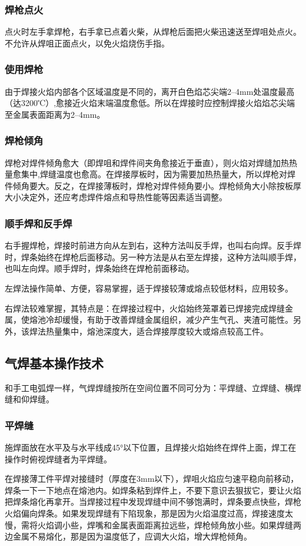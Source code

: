 \documentclass{ctexbook}
\begin{document}
\subsubsection{焊枪点火}
点火时左手拿焊枪，右手拿已点着火柴，从焊枪后面把火柴迅速送至焊咀处点火。不允许从焊咀正面点火，以免火焰烧伤手指。
\subsubsection{使用焊枪}
由于焊接火焰内部各个区域温度是不同的，离开白色焰芯尖端2--4mm处温度最高（达3200℃）,愈接近火焰末端温度愈低。所以在焊接时应控制焊接火焰焰芯尖端至金属表面距离为2--4mm。
\subsubsection{焊枪倾角}
焊枪对焊件倾角愈大（即焊咀和焊件间夹角愈接近于垂直），则火焰对焊缝加热热量愈集中,焊缝温度也愈高。在焊接厚板时，因为需要加热热量大，所以焊枪对焊件倾角要大。反之，在焊接薄板时，焊枪对焊件倾角要小。焊枪倾角大小除按板厚大小决定外，还应考虑焊件熔点和导热性能等因素适当调整。
\subsubsection{顺手焊和反手焊}
右手握焊枪，焊接时前进方向从左到右，这种方法叫反手焊，也叫右向焊。反手焊时，焊条始终在焊枪后面移动。另一种方法是从右至左焊接，这种方法叫顺手焊，也叫左向焊。顺手焊时，焊条始终在焊枪前面移动。

左焊法操作简单、方便，容易掌握，适于焊接较薄或熔点较低材料，应用较多。

右焊法较难掌握，其特点是：在焊接过程中，火焰始终笼罩着已焊接完成焊缝金属，使熔池冷却缓慢，有助于改善焊缝金属组织，减少产生气孔、夹渣可能性。另外，该焊法热量集中，熔池深度大，适合焊接厚度较大或熔点较高工件。
\subsection{气焊基本操作技术}
和手工电弧焊一样，气焊焊缝按所在空间位置不同可分为：平焊缝、立焊缝、横焊缝和仰焊缝。
\subsubsection{平焊缝}
施焊面放在水平及与水平线成45°以下位置，且焊接火焰始终在焊件上面，焊工在操作时俯视焊缝者为平焊缝。

在焊接薄工件平焊对接缝时（厚度在3mm以下），焊咀火焰应匀速平稳向前移动，焊条一下一下地点在熔池内。如焊条粘到焊件上，不要下意识去狠拔它，要让火焰把焊条熔化再拿开。当焊接过程中发现焊缝中间不够饱满时，焊条要点快些，焊枪火焰偏向焊条。如果发现焊缝有下陷现象，那是因为火焰温度过高，焊接速度太慢，需将火焰调小些，焊嘴和金属表面距离拉远些，焊枪倾角放小些。如果焊缝两边金属不易熔化，那是因为温度低了，应调大火焰，增大焊枪倾角。
\end{document}
